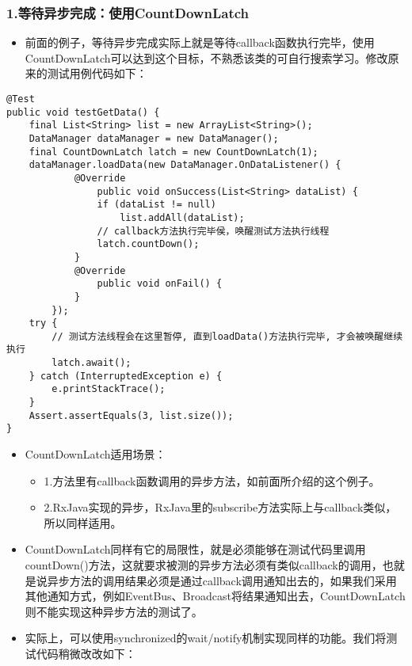 \documentclass[9pt, b5paper]{article}
\begin{document}
\subsubsection{1.等待异步完成：使用CountDownLatch}
\label{sec-1-3-1}
\begin{itemize}
\item 前面的例子，等待异步完成实际上就是等待callback函数执行完毕，使用CountDownLatch可以达到这个目标，不熟悉该类的可自行搜索学习。修改原来的测试用例代码如下：
\end{itemize}
\begin{verbatim}
@Test
public void testGetData() {
    final List<String> list = new ArrayList<String>();
    DataManager dataManager = new DataManager();
    final CountDownLatch latch = new CountDownLatch(1);
    dataManager.loadData(new DataManager.OnDataListener() {
            @Override
                public void onSuccess(List<String> dataList) {
                if (dataList != null) 
                    list.addAll(dataList);
                // callback方法执行完毕侯，唤醒测试方法执行线程
                latch.countDown();
            }
            @Override
                public void onFail() {
            }
        });
    try {
        // 测试方法线程会在这里暂停, 直到loadData()方法执行完毕, 才会被唤醒继续执行
        latch.await();
    } catch (InterruptedException e) {
        e.printStackTrace();
    }
    Assert.assertEquals(3, list.size());
}
\end{verbatim}
\begin{itemize}
\item CountDownLatch适用场景：
\begin{itemize}
\item 1.方法里有callback函数调用的异步方法，如前面所介绍的这个例子。
\item 2.RxJava实现的异步，RxJava里的subscribe方法实际上与callback类似，所以同样适用。
\end{itemize}
\item CountDownLatch同样有它的局限性，就是必须能够在测试代码里调用countDown()方法，这就要求被测的异步方法必须有类似callback的调用，也就是说异步方法的调用结果必须是通过callback调用通知出去的，如果我们采用其他通知方式，例如EventBus、Broadcast将结果通知出去，CountDownLatch则不能实现这种异步方法的测试了。
\item 实际上，可以使用synchronized的wait/notify机制实现同样的功能。我们将测试代码稍微改改如下：
\end{itemize}
\end{document}
